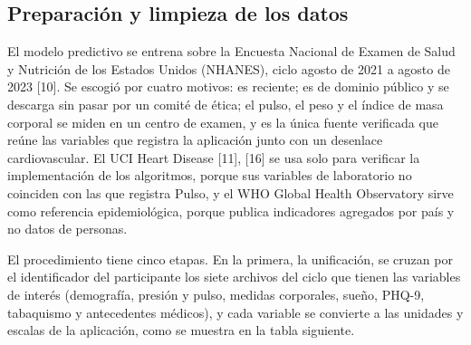 \documentclass[conference]{IEEEtran}
\begin{document}
\subsection{Preparación y limpieza de los datos}
El modelo predictivo se entrena sobre la Encuesta Nacional de Examen de Salud y Nutrición de los Estados Unidos (NHANES), ciclo agosto de 2021 a agosto de 2023 [10]. Se escogió por cuatro motivos: es reciente; es de dominio público y se descarga sin pasar por un comité de ética; el pulso, el peso y el índice de masa corporal se miden en un centro de examen, y es la única fuente verificada que reúne las variables que registra la aplicación junto con un desenlace cardiovascular. El UCI Heart Disease [11], [16] se usa solo para verificar la implementación de los algoritmos, porque sus variables de laboratorio no coinciden con las que registra Pulso, y el WHO Global Health Observatory sirve como referencia epidemiológica, porque publica indicadores agregados por país y no datos de personas.

El procedimiento tiene cinco etapas. En la primera, la unificación, se cruzan por el identificador del participante los siete archivos del ciclo que tienen las variables de interés (demografía, presión y pulso, medidas corporales, sueño, PHQ-9, tabaquismo y antecedentes médicos), y cada variable se convierte a las unidades y escalas de la aplicación, como se muestra en la tabla siguiente.
\end{document}

